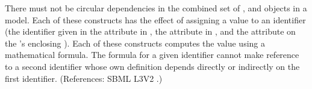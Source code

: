There must not be circular dependencies in the combined set of
\InitialAssignment, \AssignmentRule and \KineticLaw objects in a model.
Each of these constructs has the effect of assigning a value to an
identifier (\ie the identifier given in the attribute  in
\InitialAssignment, the attribute  in \AssignmentRule, and
the attribute  on the \KineticLaw's enclosing \Reaction).  Each
of these constructs computes the value using a mathematical formula.  The
formula for a given identifier cannot make reference to a second identifier
whose own definition depends directly or indirectly on the first
identifier.  (References: SBML L3V2 .)
